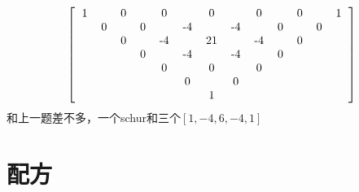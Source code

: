 \documentclass[UTF8]{ctexart}
\begin{document}
\renewcommand*{\arraystretch}{1.732}\[\left[\begin{matrix}
	\begin{tabular}{ccccccccccccc}
		1& &0& &0& &0& &0& &0& &1\\
		&0& &0& &-4& &-4& &0& &0&\\
		& &0& &-4& &21& &-4& &0& &\\
		& & &0& &-4& &-4& &0& & &\\
		& & & &0& &0& &0& & & &\\
		& & & & &0& &0& & & & &\\
		& & & & & &1& & & & & &\\
	\end{tabular}
\end{matrix}\right]\]
和上一题差不多，一个schur和三个$ [1,-4,6,-4,1] $
\section{配方}
\end{document}
